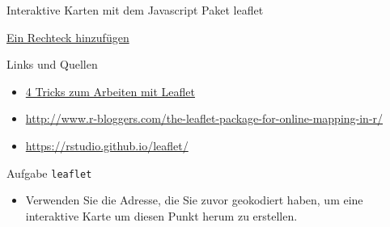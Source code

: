 \documentclass[ignorenonframetext,]{beamer}
\providecommand{\tightlist}{%
\setlength{\itemsep}{0pt}\setlength{\parskip}{0pt}}
\begin{document}
\begin{frame}[fragile]{Interaktive Karten mit dem Javascript Paket
leaflet}
\begin{block}{\href{https://rstudio.github.io/leaflet/shapes.html}{Ein
Rechteck hinzufügen}}
\end{block}

\begin{block}{Links und Quellen}

\begin{itemize}
\item
  \href{https://www.r-bloggers.com/4-tricks-for-working-with-r-leaflet-and-shiny/}{4
  Tricks zum Arbeiten mit Leaflet}
\item
  \url{http://www.r-bloggers.com/the-leaflet-package-for-online-mapping-in-r/}
\item
  \url{https://rstudio.github.io/leaflet/}
\end{itemize}

\end{block}

\begin{block}{Aufgabe \texttt{leaflet}}

\begin{itemize}
\tightlist
\item
  Verwenden Sie die Adresse, die Sie zuvor geokodiert haben, um eine
  interaktive Karte um diesen Punkt herum zu erstellen.
\end{itemize}

\end{block}

\end{frame}
\end{document}
